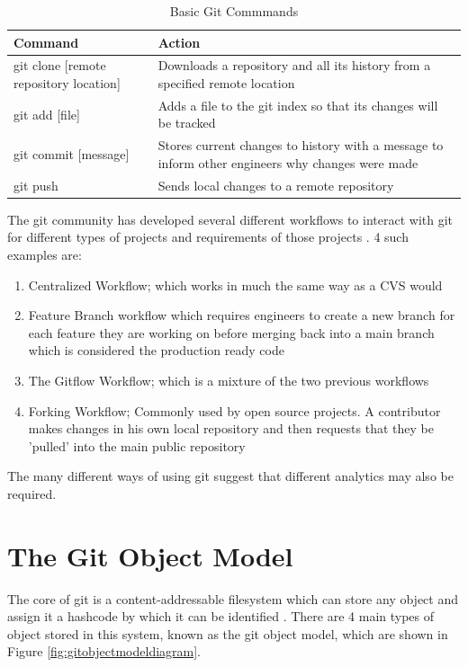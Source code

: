 \documentclass[11pt]{book}
\begin{document}
\begin{table}[h]
\centering
\begin{tabular}{| l | p{9cm} |}
\hline
\textbf{Command} & \textbf{Action} \\ \hline
git clone [remote repository location] & Downloads a repository and all its history from a specified remote location \\ \hline
git add [file] & Adds a file to the git index so that its changes will be tracked \\ \hline
git commit [message] & Stores current changes to history with a message to inform other engineers why changes were made \\ \hline
git push & Sends local changes to a remote repository \\ \hline
\end{tabular}
\caption{Basic Git Commmands}
\label{tab:basic-git-commands}
\end{table}

The git community has developed several different workflows to interact with git for different types of projects and requirements of those projects \cite{gitcomparingworkflows}. 4 such examples are: 

\begin{enumerate}
	\item Centralized Workflow; which works in much the same way as a CVS would
	\item Feature Branch workflow which requires engineers to create a new branch for each feature they are working on before merging back into a main branch which is considered the production ready code
	\item The Gitflow Workflow; which is a mixture of the two previous workflows
	\item Forking Workflow; Commonly used by open source projects. A contributor makes changes in his own local repository and then requests that they be 'pulled' into the main public repository
\end{enumerate}

The many different ways of using git suggest that different analytics may also be required.

\clearpage

\section{The Git Object Model}
The core of git is a content-addressable filesystem which can store any object and assign it a hashcode by which it can be identified \cite{progit}. There are 4 main types of object stored in this system, known as the git object model, which are shown in Figure \ref{fig:gitobjectmodeldiagram}.
\end{document}
